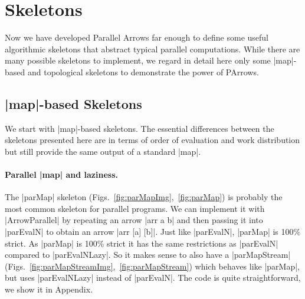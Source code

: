 \section{Skeletons}
\label{sec:skeletons}
Now we have developed Parallel Arrows far enough to define some useful algorithmic skeletons that abstract typical parallel computations. While there are many possible skeletons to implement, we regard in detail here only some |map|-based and topological skeletons to demonstrate the power of PArrows.
\subsection{|map|-based Skeletons}
\label{sec:map-skeletons}
We start with |map|-based skeletons. The essential differences between the skeletons presented here are in terms of order of evaluation and work distribution but still provide the same output of a standard |map|. 

\paragraph{Parallel |map| and laziness.}
The |parMap| skeleton (Figs.~\ref{fig:parMapImg},~\ref{fig:parMap}) is probably the most common skeleton for parallel programs. We can implement it with |ArrowParallel| by repeating an arrow |arr a b| and then passing it into |parEvalN| to obtain an arrow |arr [a] [b]|.
Just like |parEvalN|, |parMap| is 100\% strict.
As |parMap|  is 100\% strict it has the same restrictions as |parEvalN| compared to |parEvalNLazy|. So it makes sense to also have a |parMapStream| (Figs.~\ref{fig:parMapStreamImg},~\ref{fig:parMapStream}) which behaves like |parMap|, but uses |parEvalNLazy| instead of |parEvalN|. The code is quite straightforward, we show it in Appendix.

